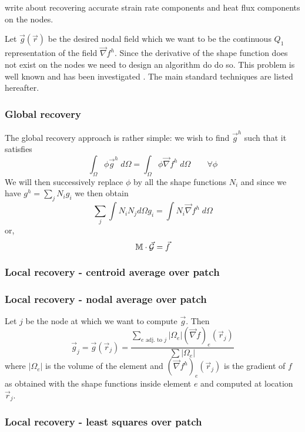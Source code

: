 
write about recovering accurate strain rate components and heat flux components on the nodes.

Let $\vec g(\vec r)$  be the desired nodal 
field which we want to be the continuous $Q_1$ representation of the field $\vec \nabla f^h$.
Since the derivative of the shape function does not exist on the nodes we need to design
an algorithm do do so. This problem is well known and has been 
investigated 
.
The main standard techniques are listed hereafter.


\subsubsection{Global recovery}

The global recovery approach is rather simple: we wish to find $\vec g^h$
such that it satisfies
\[
\int_\Omega \phi \vec g^h \; d\Omega  = \int_\Omega \phi \vec\nabla f^h \; d\Omega 
\quad\quad \forall \phi
\] 
We will then successively replace $\phi$ by all the shape functions $N_i$ 
and since we have $g^h=\sum_j N_i g_i$ we then obtain
\[
\sum_j \int N_i N_j d\Omega g_i = \int N_i  \vec\nabla f^h \; d\Omega 
\]
or, 
\[
\mathbb{M} \cdot \vec{\cal G} = \vec f
\]



\subsubsection{Local recovery - centroid average over patch}





\subsubsection{Local recovery - nodal average over patch}

Let $j$ be the node at which we want to compute $\vec g$.
Then 
\[
\vec g_j = \vec g(\vec r_j) = 
\frac{\sum\limits_{ e \text{ adj. to }j} |\Omega_e| (\vec\nabla f)_e(\vec r_j) }{\sum |\Omega_e|}
\]
where $|\Omega_e|$ is the volume of the element and $(\vec\nabla f^h)_e(\vec r_j)$
is the gradient of $f$ as obtained with the shape functions inside element $e$ and 
computed at location $\vec r_j$.

\subsubsection{Local recovery - least squares over patch}



